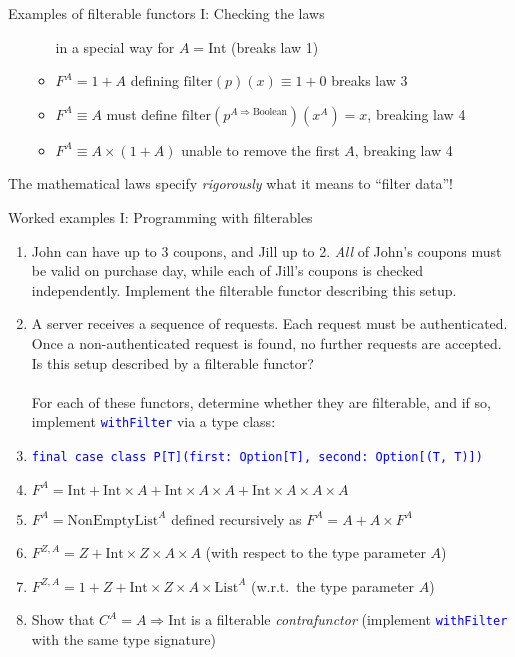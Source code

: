\documentclass[english]{beamer}
\begin{document}
\begin{frame}{Examples of filterable functors I: Checking the laws}
\begin{itemize}
\begin{itemize}
in a special way for $A=\text{Int}$ (breaks law 1)
\item $F^{A}=1+A$ defining $\text{filter}\left(p\right)\left(x\right)\equiv1+0$
breaks law 3
\item $F^{A}\equiv A$ \textendash{} must define $\text{filter}\left(p^{A\Rightarrow\text{Boolean}}\right)\left(x^{A}\right)=x$,
breaking law 4
\item $F^{A}\equiv A\times\left(1+A\right)$ \textendash{} unable to remove
the first $A$, breaking law 4
\end{itemize}
\end{itemize}
The mathematical laws specify \emph{rigorously} what it means to ``filter
data''!
\end{frame}

\begin{frame}{Worked examples I: Programming with filterables}
\begin{enumerate}
\item John can have up to 3 coupons, and Jill up to 2. \emph{All} of John's
coupons must be valid on purchase day, while each of Jill's coupons
is checked independently. Implement the filterable functor describing
this setup.
\item A server receives a sequence of requests. Each request must be authenticated.
Once a non-authenticated request is found, no further requests are
accepted. Is this setup described by a filterable functor?\\
\ \\
For each of these functors, determine whether they are filterable,
and if so, implement \texttt{\textcolor{blue}{\footnotesize{}withFilter}}
via a type class:
\item \texttt{\textcolor{blue}{\footnotesize{}final case class P{[}T{]}(first:\ Option{[}T{]},
second:\  Option{[}(T, T){]})}}{\footnotesize \par}
\item $F^{A}=\text{Int}+\text{Int}\times A+\text{Int}\times A\times A+\text{Int}\times A\times A\times A$
\item $F^{A}=\text{NonEmptyList}^{A}$ defined recursively as $F^{A}=A+A\times F^{A}$ 
\item $F^{Z,A}=Z+\text{Int}\times Z\times A\times A$ (with respect to the
type parameter $A$)
\item $F^{Z,A}=1+Z+\text{Int}\times Z\times A\times\text{List}^{A}$ (w.r.t.\ the
type parameter $A$)
\item Show that $C^{A}=A\Rightarrow\text{Int}$ is a filterable \emph{contrafunctor}
(implement \texttt{\textcolor{blue}{\footnotesize{}withFilter}} with
the same type signature)
\end{enumerate}
\end{frame}
\end{document}

